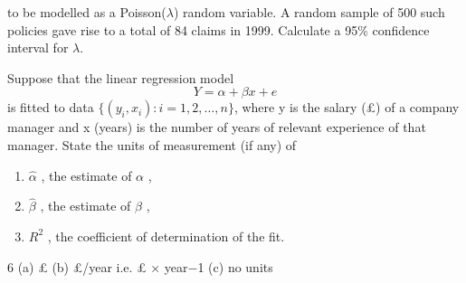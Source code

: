 \documentclass[a4paper,12pt]{article}
\begin{document}
to be modelled as a Poisson($\lambda$) random variable. A random sample of 500 such policies gave rise to a total of 84 claims in 1999.
Calculate a 95\% confidence interval for $\lambda$. 
\newpage

\noindent Suppose that the linear regression model
\[Y = \alpha + \beta x + e\]
is fitted to data $\{(y_i , x_i) : i = 1, 2, \ldots , n\}$, where y is the salary (£) of a company
manager and x (years) is the number of years of relevant experience of that
manager.
State the units of measurement (if any) of
\begin{enumerate}
    \item  $\hat{\alpha}$ , the estimate of $\alpha$ ,
\item $\hat{\beta}$ , the estimate of $\beta$ ,
\item $R^2$ , the coefficient of determination of the fit. 
\end{enumerate}


6 (a) £
(b) £/year i.e. £ × year−1
(c) no units


\newpage


\end{document}

